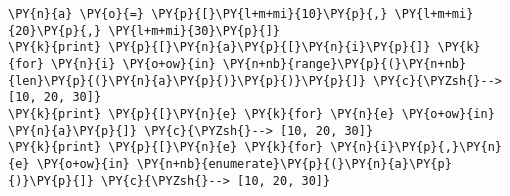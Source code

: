 \begin{Verbatim}[commandchars=\\\{\}]
\PY{n}{a} \PY{o}{=} \PY{p}{[}\PY{l+m+mi}{10}\PY{p}{,} \PY{l+m+mi}{20}\PY{p}{,} \PY{l+m+mi}{30}\PY{p}{]}
\PY{k}{print} \PY{p}{[}\PY{n}{a}\PY{p}{[}\PY{n}{i}\PY{p}{]} \PY{k}{for} \PY{n}{i} \PY{o+ow}{in} \PY{n+nb}{range}\PY{p}{(}\PY{n+nb}{len}\PY{p}{(}\PY{n}{a}\PY{p}{)}\PY{p}{)}\PY{p}{]} \PY{c}{\PYZsh{}--> [10, 20, 30]}
\PY{k}{print} \PY{p}{[}\PY{n}{e} \PY{k}{for} \PY{n}{e} \PY{o+ow}{in} \PY{n}{a}\PY{p}{]} \PY{c}{\PYZsh{}--> [10, 20, 30]}
\PY{k}{print} \PY{p}{[}\PY{n}{e} \PY{k}{for} \PY{n}{i}\PY{p}{,}\PY{n}{e} \PY{o+ow}{in} \PY{n+nb}{enumerate}\PY{p}{(}\PY{n}{a}\PY{p}{)}\PY{p}{]} \PY{c}{\PYZsh{}--> [10, 20, 30]}
\end{Verbatim}
